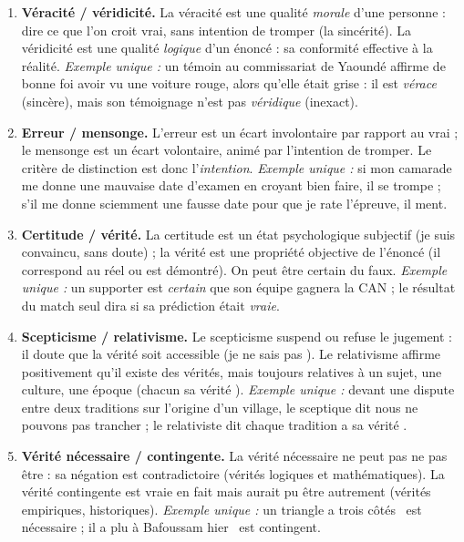 \documentclass[11pt]{article}
\newcommand{\cle}[1]{{\popxbold\color{popdark}#1}}
\begin{document}
\begin{corrige}
\begin{enumerate}
\item \textbf{Véracité / véridicité.} La \cle{véracité} est une qualité \emph{morale} d'une personne : dire ce que l'on croit vrai, sans intention de tromper (la sincérité). La \cle{véridicité} est une qualité \emph{logique} d'un énoncé : sa conformité effective à la réalité. \emph{Exemple unique :} un témoin au commissariat de Yaoundé affirme de bonne foi avoir vu une voiture rouge, alors qu'elle était grise : il est \emph{vérace} (sincère), mais son témoignage n'est pas \emph{véridique} (inexact).
\item \textbf{Erreur / mensonge.} L'\cle{erreur} est un écart involontaire par rapport au vrai ; le \cle{mensonge} est un écart volontaire, animé par l'intention de tromper. Le critère de distinction est donc l'\emph{intention}. \emph{Exemple unique :} si mon camarade me donne une mauvaise date d'examen en croyant bien faire, il se trompe ; s'il me donne sciemment une fausse date pour que je rate l'épreuve, il ment.
\item \textbf{Certitude / vérité.} La \cle{certitude} est un état psychologique subjectif (je suis convaincu, sans doute) ; la \cle{vérité} est une propriété objective de l'énoncé (il correspond au réel ou est démontré). On peut être certain du faux. \emph{Exemple unique :} un supporter est \emph{certain} que son équipe gagnera la CAN ; le résultat du match seul dira si sa prédiction était \emph{vraie}.
\item \textbf{Scepticisme / relativisme.} Le \cle{scepticisme} suspend ou refuse le jugement : il doute que la vérité soit accessible (\guillemotleft je ne sais pas \guillemotright). Le \cle{relativisme} affirme positivement qu'il existe des vérités, mais toujours relatives à un sujet, une culture, une époque (\guillemotleft chacun sa vérité \guillemotright). \emph{Exemple unique :} devant une dispute entre deux traditions sur l'origine d'un village, le sceptique dit \guillemotleft nous ne pouvons pas trancher \guillemotright ; le relativiste dit \guillemotleft chaque tradition a sa vérité \guillemotright.
\item \textbf{Vérité nécessaire / contingente.} La vérité \cle{nécessaire} ne peut pas ne pas être : sa négation est contradictoire (vérités logiques et mathématiques). La vérité \cle{contingente} est vraie en fait mais aurait pu être autrement (vérités empiriques, historiques). \emph{Exemple unique :} \guillemotleft un triangle a trois côtés \guillemotright\ est nécessaire ; \guillemotleft il a plu à Bafoussam hier \guillemotright\ est contingent.
\end{enumerate}
\end{corrige}
\end{document}
